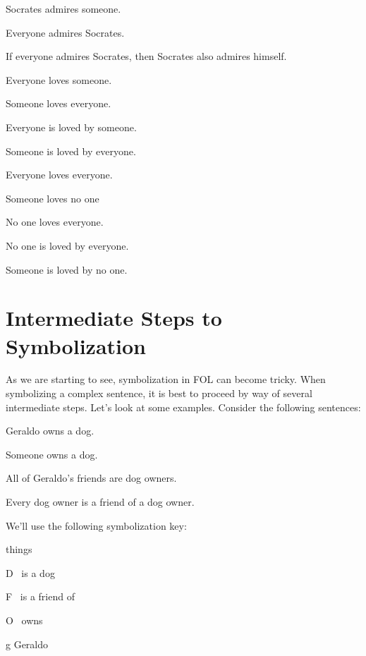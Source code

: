 \begin{earg}
\item Socrates admires someone.
\item Everyone admires Socrates.
\item If everyone admires Socrates, then Socrates also admires himself.
\item  Everyone loves someone.
\item Someone loves everyone.
\item Everyone is loved by someone.
\item  Someone is loved by everyone.
\item Everyone loves everyone.
\item Someone loves no one
\item No one loves everyone.
\item No one is  loved by everyone.
\item Someone is loved by no one.
\end{earg}




\section{Intermediate Steps to Symbolization}\label{s:FOLSymSteps}
As we are starting to see, symbolization in FOL can become tricky. When symbolizing a complex sentence, it is best to proceed by way of several intermediate steps. Let's look at some examples. Consider the following sentences:
\begin{earg}
\item[\ex{dog2}] Geraldo owns a dog.
\item[\ex{dog3}] Someone owns a dog.
\item[\ex{dog4}] All of Geraldo's friends are dog owners.
\item[\ex{dog5}] Every dog owner is a friend of a dog owner.
\end{earg}
We'll use the following symbolization key:
\begin{ekey}
\item[\text{domain}] things
\item[D] \blank\ is a dog
\item[F] \blank\ is a friend of \blank
\item[O] \blank\ owns \blank
\item[g] Geraldo
\end{ekey}

